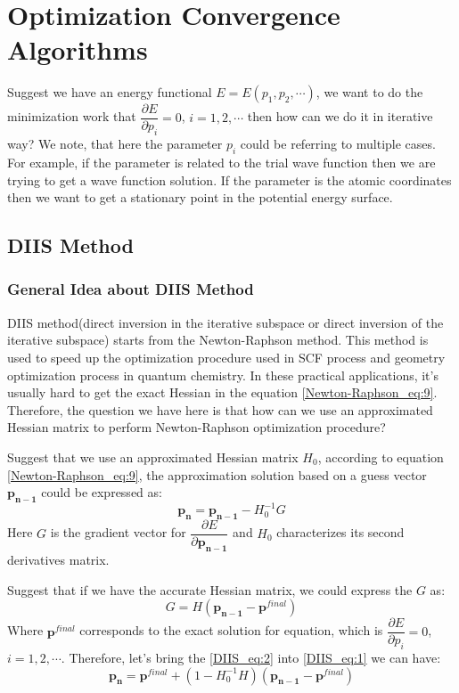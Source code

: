 %
%
\chapter{Optimization Convergence Algorithms}

Suggest we have an energy functional $E = E(p_{1}, p_{2}, \cdots)$, we want to do the minimization 
work that $\dfrac{\partial E}{\partial p_{i}} = 0$, $i = 1, 2, \cdots$ then how can we do it in
iterative way? We note, that here the parameter $p_{i}$ could be referring to multiple
cases. For example, if the parameter is related to the trial wave function then we are trying to
get a wave function solution. If the parameter is the atomic coordinates then we want to get 
a stationary point in the potential energy surface.

\section{DIIS Method}
%
%
%
\subsection{General Idea about DIIS Method}
%
%
%
DIIS method(direct inversion in the iterative subspace or direct inversion of the iterative subspace)
\cite{Pulay1980393, JCC:JCC540030413} starts from the Newton-Raphson method. This method is used to
speed up the optimization procedure used in SCF process and geometry optimization process in quantum
chemistry. In these practical applications, it's usually hard to get the exact Hessian in the 
equation \ref{Newton-Raphson_eq:9}. Therefore, the question we have here is that how can we use an 
approximated Hessian matrix to perform Newton-Raphson optimization procedure?

Suggest that we use an approximated Hessian matrix $H_{0}$, according to equation
\ref{Newton-Raphson_eq:9}, the approximation solution based on a guess vector $\mathbf{p_{n-1}}$ 
could be expressed as:
\begin{equation}
\label{DIIS_eq:1}
 \mathbf{p_{n}} = \mathbf{p_{n-1}} - H_{0}^{-1}G
\end{equation}
Here $G$ is the gradient vector for $\dfrac{\partial E}{\partial \mathbf{p_{n-1}}}$ and 
$H_{0}$ characterizes its second derivatives matrix.

Suggest that if we have the accurate Hessian matrix, we could express the $G$ as:
\begin{equation}
\label{DIIS_eq:2}
 G = H(\mathbf{p_{n-1}} - \mathbf{p}^{final})
\end{equation}
Where $\mathbf{p}^{final}$ corresponds to the exact solution for equation, which is 
$\dfrac{\partial E}{\partial p_{i}} = 0$, $i = 1, 2, \cdots$. 
Therefore, let's bring the \ref{DIIS_eq:2} into \ref{DIIS_eq:1} we can have:
\begin{equation}
 \label{DIIS_eq:3}
 \mathbf{p_{n}} = \mathbf{p}^{final} + (1-H_{0}^{-1}H)(\mathbf{p_{n-1}} - \mathbf{p}^{final})
\end{equation}


